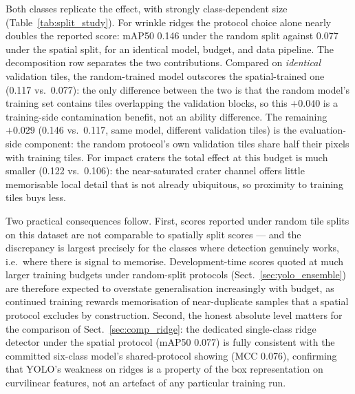 Both classes replicate the effect, with strongly class-dependent size (Table~\ref{tab:split_study}). For wrinkle ridges the protocol choice alone nearly doubles the reported score: mAP50 0.146 under the random split against 0.077 under the spatial split, for an identical model, budget, and data pipeline. The decomposition row separates the two contributions. Compared on \emph{identical} validation tiles, the random-trained model outscores the spatial-trained one (0.117 vs.\ 0.077): the only difference between the two is that the random model's training set contains tiles overlapping the validation blocks, so this $+0.040$ is a training-side contamination benefit, not an ability difference. The remaining $+0.029$ (0.146 vs.\ 0.117, same model, different validation tiles) is the evaluation-side component: the random protocol's own validation tiles share half their pixels with training tiles. For impact craters the total effect at this budget is much smaller (0.122 vs.\ 0.106): the near-saturated crater channel offers little memorisable local detail that is not already ubiquitous, so proximity to training tiles buys less.

Two practical consequences follow. First, scores reported under random tile splits on this dataset are not comparable to spatially split scores --- and the discrepancy is largest precisely for the classes where detection genuinely works, i.e.\ where there is signal to memorise. Development-time scores quoted at much larger training budgets under random-split protocols (Sect.~\ref{sec:yolo_ensemble}) are therefore expected to overstate generalisation increasingly with budget, as continued training rewards memorisation of near-duplicate samples that a spatial protocol excludes by construction. Second, the honest absolute level matters for the comparison of Sect.~\ref{sec:comp_ridge}: the dedicated single-class ridge detector under the spatial protocol (mAP50 0.077) is fully consistent with the committed six-class model's shared-protocol showing (MCC 0.076), confirming that YOLO's weakness on ridges is a property of the box representation on curvilinear features, not an artefact of any particular training run.

